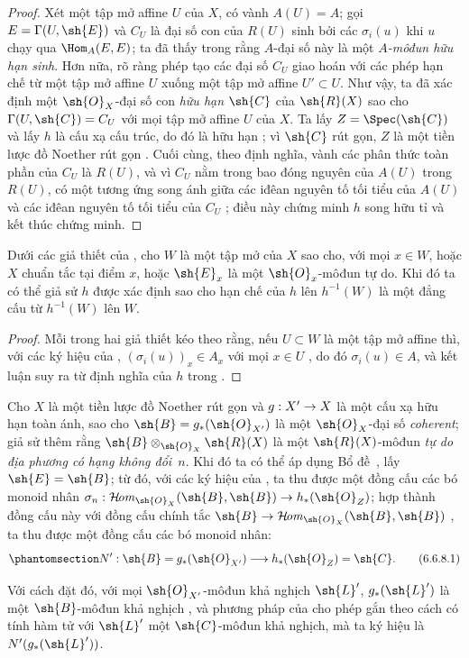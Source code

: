 \documentclass[oneside,10pt]{amsart}
\makeatletter
\newcommand{\ega@arrow}[2]{\mathchoice{#1}{#2}{#2}{#2}}
\renewcommand{\to}{\ega@arrow{\longrightarrow}{\rightarrow}}
\def\shHom{\mathcal{H}\!\mathit{om}}
\newcommand{\oldpage}[2][]{\marginnote{\normalfont\footnotesize\textbf{#1}~|~#2}\ignorespaces}
\let\EGAOriginalLabel\label
\renewcommand{\label}[1]{\phantomsection\EGAOriginalLabel{#1}}
\makeatother
\begin{document}
\begin{proof}
Xét một tập mở affine $U$ của $X$, có vành $A(U)=A$;
gọi $E=\Gamma(U,\sh{E})$ và $C_U$ là đại số con của $R(U)$ sinh bởi các $\sigma_i(u)$ khi $u$ chạy qua $\Hom_A(E,E)$;
ta đã thấy trong  rằng $A$-đại số này là một \emph{$A$-môđun hữu hạn sinh}.
Hơn nữa, rõ ràng phép tạo các đại số $C_U$ giao hoán với các phép hạn chế từ một tập mở affine $U$ xuống một tập mở affine $U'\subset U$.
Như vậy, ta đã xác định một $\sh{O}_X$-đại số con \emph{hữu hạn} $\sh{C}$ của $\sh{R}(X)$ sao cho $\Gamma(U,\sh{C})=C_U$ với mọi tập mở affine $U$ của $X$. Ta
\oldpage[II]{133}
lấy $Z=\Spec(\sh{C})$ và lấy $h$ là cấu xạ cấu trúc, do đó là hữu hạn ;
vì $\sh{C}$ rút gọn, $Z$ là một tiền lược đồ Noether rút gọn .
Cuối cùng, theo định nghĩa, vành các phân thức toàn phần của $C_U$ là $R(U)$, và vì $C_U$ nằm trong bao đóng nguyên của $A(U)$ trong $R(U)$, có một tương ứng song ánh giữa các iđêan nguyên tố tối tiểu của $A(U)$ và các iđêan nguyên tố tối tiểu của $C_U$ \cite[t.~I, p.~259]{I-13}; điều này chứng minh $h$ song hữu tỉ và kết thúc chứng minh.
\end{proof}

\begin{corollary}[6.6.7]
\label{II.6.6.7}
Dưới các giả thiết của , cho $W$ là một tập mở của $X$ sao cho, với mọi $x\in W$, hoặc $X$ chuẩn tắc tại điểm $x$, hoặc $\sh{E}_x$ là một $\sh{O}_x$-môđun tự do.
Khi đó ta có thể giả sử $h$ được xác định sao cho hạn chế của $h$ lên $h^{-1}(W)$ là một đẳng cấu từ $h^{-1}(W)$ lên $W$.
\end{corollary}

\begin{proof}
Mỗi trong hai giả thiết kéo theo rằng, nếu $U\subset W$ là một tập mở affine thì, với các ký hiệu của , $(\sigma_i(u))_x\in A_x$ với mọi $x\in U$ , do đó $\sigma_i(u)\in A$, và kết luận suy ra từ định nghĩa của $h$ trong .
\end{proof}

\begin{env}[6.6.8]
\label{II.6.6.8}
Cho $X$ là một tiền lược đồ Noether rút gọn và $g:X'\to X$ là một cấu xạ hữu hạn toàn ánh, sao cho $\sh{B}=g_*(\sh{O}_{X'})$ là một $\sh{O}_X$-đại số \emph{coherent};
giả sử thêm rằng $\sh{B}\otimes_{\sh{O}_X}\sh{R}(X)$ là một $\sh{R}(X)$-môđun \emph{tự do địa phương có hạng không đổi~$n$}.
Khi đó ta có thể áp dụng Bổ đề~, lấy $\sh{E}=\sh{B}$; từ đó, với các ký hiệu của , ta thu được một đồng cấu các bó monoid nhân $\sigma_n:\shHom_{\sh{O}_X}(\sh{B},\sh{B})\to h_*(\sh{O}_Z)$; hợp thành đồng cấu này với đồng cấu chính tắc $\sh{B}\to\shHom_{\sh{O}_X}(\sh{B},\sh{B})$ , ta thu được một đồng cấu các bó monoid nhân:
\[
\label{II.6.6.8.1}
  N' : \sh{B} = g_*(\sh{O}_{X'}) \to h_*(\sh{O}_Z) = \sh{C}.
\tag{6.6.8.1}
\]

Với cách đặt đó, với mọi $\sh{O}_{X'}$-môđun khả nghịch $\sh{L}'$, $g_*(\sh{L}')$ là một $\sh{B}$-môđun khả nghịch , và phương pháp của  cho phép gắn theo cách có tính hàm tử với $\sh{L}'$ một $\sh{C}$-môđun khả nghịch, mà ta ký hiệu là $N'(g_*(\sh{L}'))$.
\end{env}
\end{document}
